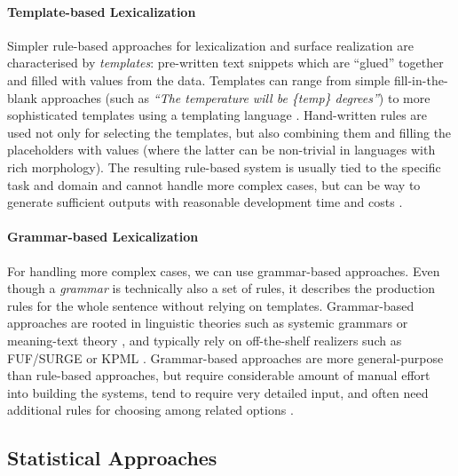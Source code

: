 \paragraph{Template-based Lexicalization} Simpler rule-based approaches for lexicalization and surface realization are characterised by \emph{templates}: pre-written text snippets which are ``glued'' together and filled with values from the data. Templates can range from simple fill-in-the-blank approaches (such as \textit{``The temperature will be \{temp\} degrees''}) to more sophisticated templates using a templating language \cite{reiter2016nlg,gatt2009simplenlg}.  Hand-written rules are used not only for selecting the templates, but also combining them and filling the placeholders with values (where the latter can be non-trivial in languages with rich morphology). The resulting rule-based system is usually tied to the specific task and domain and cannot handle more complex cases, but can be way to generate sufficient outputs with reasonable development time and costs \cite{vanderleeAutomatedLearningTemplates2018}.


\paragraph{Grammar-based Lexicalization} For handling more complex cases, we can use grammar-based approaches. Even though a \emph{grammar} is technically also a set of rules, it describes the production rules for the whole sentence without relying on templates.
Grammar-based approaches are rooted in linguistic theories such as systemic grammars \cite{halliday1985systemic,matthiessen1991lexico} or meaning-text theory \cite{mel1988dependency,goldberg1994using,milleModD2TMultilayerDataset2023}, and typically rely on off-the-shelf realizers such as FUF/SURGE \cite{elhadad1997surge} or KPML \cite{bateman1997enabling}. Grammar-based approaches are more general-purpose than rule-based approaches, but require considerable amount of manual effort into building the systems, tend to require very detailed
input, and often need additional rules for choosing among related options \cite{gattSurveyStateArt2018}.


\subsection{Statistical Approaches}
\label{sec:stat-d2t}

